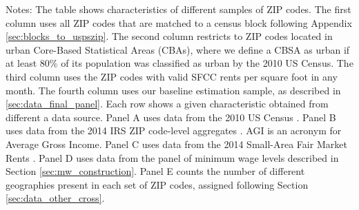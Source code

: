 \begin{landscape}
\begin{table}[hbt!]
    \begin{minipage}{.95\linewidth} \footnotesize
        \vspace{2mm}
        Notes: The table shows characteristics of different samples of ZIP codes.
        The first column uses all ZIP codes that are matched to a census block
        following Appendix \ref{sec:blocks_to_uspszip}.
        The second column restricts to ZIP codes located in urban Core-Based
        Statistical Areas (CBAs), where we define a CBSA as urban if at least
        80\% of its population was classified as urban by the 2010 US Census.
        The third column uses the ZIP codes with valid SFCC rents per square 
        foot in any month.
        The fourth column uses our baseline estimation sample, as described in 
        \ref{sec:data_final_panel}.
        Each row shows a given characteristic obtained from different a data 
        source.
        Panel A uses data from the 2010 US Census \parencite{CensusDecennial}.
        Panel B uses data from the 2014 IRS ZIP code-level aggregates
        \parencite{IRS}. AGI is an acronym for Average Gross Income.
        Panel C uses data from the 2014 Small-Area Fair Market 
        Rents \parencite[SAFMR;][]{hudSAFMR}.
        Panel D uses data from the panel of minimum wage levels 
        described in Section \ref{sec:mw_construction}.
        Panel E counts the number of different geographies present in each set
        of ZIP codes, assigned following Section \ref{sec:data_other_cross}.
    \end{minipage}
\end{table}
\end{landscape}
